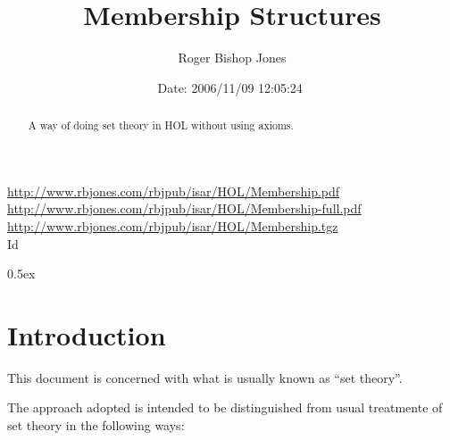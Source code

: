 \documentclass[11pt,a4paper]{article}
\begin{document}
\title{Membership Structures}
\author{Roger Bishop Jones}
\date{$ $Date: 2006/11/09 12:05:24 $ $}
\maketitle

\begin{abstract}
A way of doing set theory in HOL without using axioms.
\end{abstract}

\vfill
\begin{centering}
{\footnotesize
\href{http://www.rbjones.com/rbjpub/isar/HOL/Membership.pdf}{http://www.rbjones.com/rbjpub/isar/HOL/Membership.pdf}\\
\href{http://www.rbjones.com/rbjpub/isar/HOL/Membership-full.pdf}{http://www.rbjones.com/rbjpub/isar/HOL/Membership-full.pdf}\\
\href{http://www.rbjones.com/rbjpub/isar/HOL/Membership.tgz}{http://www.rbjones.com/rbjpub/isar/HOL/Membership.tgz}\\
$ $Id $ $
}%
\end{centering}

\newpage

\tableofcontents

\parindent 0pt\parskip 0.5ex

\section{Introduction}

This document is concerned with what is usually known as ``set theory''.

The approach adopted is intended to be distinguished from usual treatmente of set theory in the following ways:
\end{document}
